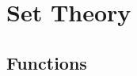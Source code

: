 \documentclass[../main.tex]{subfiles}
\begin{document}
\ifmainfile
\else
    \makeatletter
    \begin{flushright}
        \@title \\
        \@author \\
        \@date
    \end{flushright}
    \addtocounter{chapter}{2}
    \addtocounter{section}{2}
    \let\clearpage\relax
    \chapter{Set Theory}
    \mainfiletrue
\fi

\section{Functions}




\end{document}
